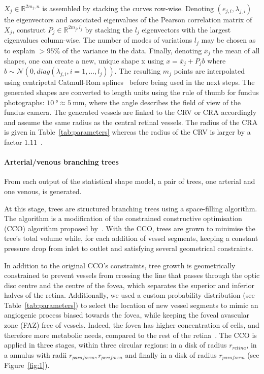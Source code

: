 \documentclass[11pt,]{article}
\begin{document}
$X_j\in\mathbb R^{2m_j,n}$ is assembled by stacking the curves
row-wise. Denoting $(e_{j,i}, \lambda_{j,i})$ the eigenvectors and
associated eigenvalues of the Pearson correlation matrix of $X_j$,
construct $P_j\in\mathbb R^{2m_j,l_j}$ by stacking the $l_j$
eigenvectors with the largest eigenvalues column-wise. The number of
modes of variations $l_j$ may be chosen as to explain $>95\%$ of the
variance in the data. Finally, denoting $\bar x_j$ the mean of all
shapes, one can create a new, unique shape x using $x=\bar x_j + P_jb$
where $b\sim\mathcal N(0,diag(\lambda_{j,i}, i=1,...,l_j))$. The
resulting $m_j$ points are interpolated using centripetal Catmull-Rom splines~\cite{Catmull_1974} before being used in the next steps.
The generated shapes are converted to length units using the rule of thumb for fundus photographs: $\SI{10}{\degree}\approx\SI{5}{\mm}$, where the angle describes the
field of view of the fundus camera. The generated vessels are linked
to the CRV or CRA accordingly and
assume the same radius as the central retinal vessels.
The radius of the CRA is given in Table~\ref{tab:parameters} whereas the radius of the CRV is larger by a factor $1.11$~\cite{Goldenberg2013}.

\paragraph{Arterial/venous branching trees}\label{sec:CCO}

From each output of the statistical shape model, a pair of trees, one
arterial and one venous, is generated.

At this stage, trees are structured branching trees using a
space-filling algorithm. The algorithm is a modification of the
constrained constructive optimisation (CCO) algorithm proposed
by~\cite{Talou2021}. With the CCO, trees are grown to minimise the tree’s
total volume while, for each addition of vessel segments,
keeping a constant pressure drop from
inlet to outlet and satisfying several geometrical constraints.

In addition to the original CCO’s constraints, tree growth is
geometrically constrained to prevent vessels from crossing the line
that passes through the optic disc centre and the centre of the fovea,
which separates the superior and inferior halves of the
retina. Additionally, we used a custom probability distribution
(see Table~\ref{tab:parameters}) 
to select the location of new vessel segments to mimic an angiogenic
process biased towards the fovea, while keeping the foveal avascular
zone (FAZ) free of vessels. 
Indeed, the fovea has higher concentration
of cells, and therefore more metabolic needs, compared to the rest of
the retina~\cite{Zouache2022}.
The CCO is applied in three stages, within three circular regions: in
a disk of radius $r_{retina}$, in a annulus with radii $r_{parafovea},
r_{perifovea}$ and finally in a disk of radius $r_{parafovea}$
(see Figure~\ref{fig:1}).
\end{document}
